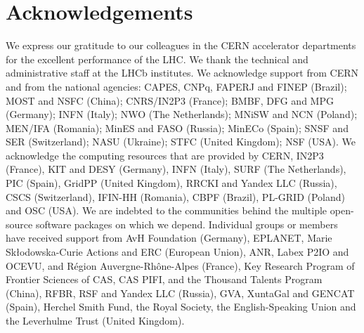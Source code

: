 \section*{Acknowledgements}
%
%
\noindent We express our gratitude to our colleagues in the CERN
accelerator departments for the excellent performance of the LHC. We
thank the technical and administrative staff at the LHCb
institutes. We acknowledge support from CERN and from the national
agencies: CAPES, CNPq, FAPERJ and FINEP (Brazil); MOST and NSFC
(China); CNRS/IN2P3 (France); BMBF, DFG and MPG (Germany); INFN
(Italy); NWO (The Netherlands); MNiSW and NCN (Poland); MEN/IFA
(Romania); MinES and FASO (Russia); MinECo (Spain); SNSF and SER
(Switzerland); NASU (Ukraine); STFC (United Kingdom); NSF (USA).  We
acknowledge the computing resources that are provided by CERN, IN2P3
(France), KIT and DESY (Germany), INFN (Italy), SURF (The
Netherlands), PIC (Spain), GridPP (United Kingdom), RRCKI and Yandex
LLC (Russia), CSCS (Switzerland), IFIN-HH (Romania), CBPF (Brazil),
PL-GRID (Poland) and OSC (USA). We are indebted to the communities
behind the multiple open-source software packages on which we depend.
Individual groups or members have received support from AvH Foundation
(Germany), EPLANET, Marie Sk\l{}odowska-Curie Actions and ERC
(European Union), ANR, Labex P2IO and OCEVU, and R\'{e}gion
Auvergne-Rh\^{o}ne-Alpes (France), Key Research Program of Frontier
Sciences of CAS, CAS PIFI, and the Thousand Talents Program (China),
RFBR, RSF and Yandex LLC (Russia), GVA, XuntaGal and GENCAT (Spain),
Herchel Smith Fund, the Royal Society, the English-Speaking Union and
the Leverhulme Trust (United Kingdom).
